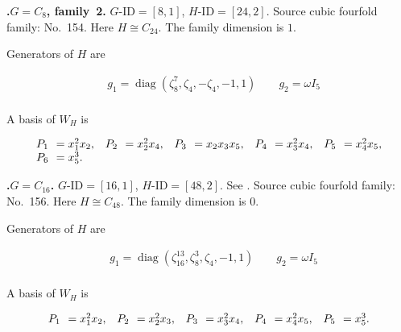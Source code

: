 \documentclass[12pt]{amsart}
\makeatletter
\numberwithin{equation}{section}
\theoremstyle{plain}
\theoremstyle{definition}
\theoremstyle{remark}
\DeclareMathOperator{\diag}{diag}
\newcommand{\PBasisLabel}[1]{\mathrlap{P_{#1}}\phantom{P_{99}}}
\newenvironment{SecEightAlignedBasis}[1]{%
  \begingroup\renewcommand{\arraystretch}{1.18}%
  \[\begin{array}{@{}#1@{}}%
}{\end{array}\]\endgroup}
\newenvironment{familydisplay}{%
  \begingroup
  \setlength{\arraycolsep}{1.35pt}%
  \renewcommand{\arraystretch}{0.96}%
  \setlength{\jot}{2pt}%
}{\endgroup}
\makeatother
\begin{document}
\par{}\medskip\noindent\textbf{.\enspace $G=C_8$, family~2.}\label{fam:threefold-no-39}
$G\text{-ID}=[8,1]$, $H\text{-ID}=[24,2]$.
Source cubic fourfold family: No.~154.  Here
$H\cong C_{24}$.
The family dimension is $1$.
\par\smallskip\noindent Generators of $H$ are\par\nopagebreak
\begin{familydisplay}
\begin{align*}
&g_{1}=\diag(\zeta_8^7,\zeta_4,-\zeta_4,-1,1)
\qquad g_{2}=\omega I_5\\
\end{align*}
\end{familydisplay}
\par\smallskip\noindent A basis of $W_H$ is\par\nopagebreak
\begin{familydisplay}
\begin{SecEightAlignedBasis}{l@{\quad}l@{\quad}l@{\quad}l@{\quad}l}
\PBasisLabel{1}=x_{1}^{2}x_{2}, & \PBasisLabel{2}=x_{2}^{2}x_{4}, & \PBasisLabel{3}=x_{2}x_{3}x_{5}, & \PBasisLabel{4}=x_{3}^{2}x_{4}, & \PBasisLabel{5}=x_{4}^{2}x_{5},\\
\multicolumn{5}{@{}l@{}}{\PBasisLabel{6}=x_{5}^{3}.}
\end{SecEightAlignedBasis}
\end{familydisplay}

\par{}\medskip\noindent\textbf{.\enspace $G=C_{16}$.}\label{fam:threefold-no-40}
$G\text{-ID}=[16,1]$, $H\text{-ID}=[48,2]$.
See \cite[Example~3.1(4)]{LiYuThreefold}.
Source cubic fourfold family: No.~156.  Here
$H\cong C_{48}$.
The family dimension is $0$.
\par\smallskip\noindent Generators of $H$ are\par\nopagebreak
\begin{familydisplay}
\begin{align*}
&g_{1}=\diag(\zeta_{16}^{13},\zeta_8^3,\zeta_4,-1,1)
\qquad g_{2}=\omega I_5\\
\end{align*}
\end{familydisplay}
\par\smallskip\noindent A basis of $W_H$ is\par\nopagebreak
\begin{familydisplay}
\begin{SecEightAlignedBasis}{l@{\quad}l@{\quad}l@{\quad}l@{\quad}l}
\PBasisLabel{1}=x_{1}^{2}x_{2}, & \PBasisLabel{2}=x_{2}^{2}x_{3}, & \PBasisLabel{3}=x_{3}^{2}x_{4}, & \PBasisLabel{4}=x_{4}^{2}x_{5}, & \PBasisLabel{5}=x_{5}^{3}.
\end{SecEightAlignedBasis}
\end{familydisplay}
\end{document}
